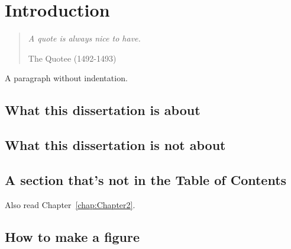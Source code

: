 %
%

\chapter{Introduction}


\begin{quote}

{\em A quote is always nice to have.}

 The Quotee (1492-1493)

\end{quote}


\noindent
A paragraph without indentation.



\section{What this dissertation is about}

\section{What this dissertation is not about}



\pagebreak
\section*{A section that's not in the Table of Contents}

Also read Chapter~\ref{chap:Chapter2}.


\section{How to make a figure}




